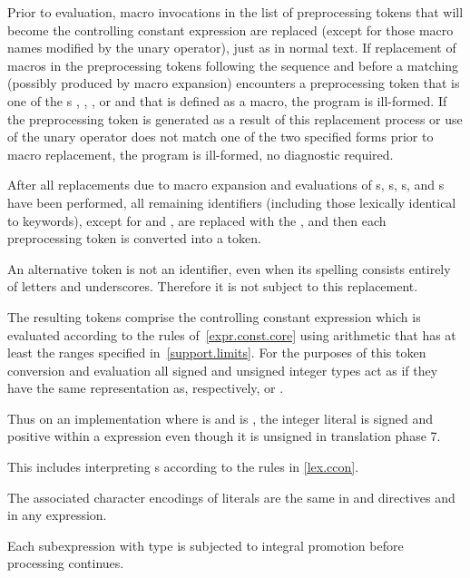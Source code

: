 \pnum
Prior to evaluation,
macro invocations in the list of preprocessing tokens
that will become the controlling constant expression
are replaced
(except for those macro names modified by the
unary operator),
just as in normal text.
If replacement of macros in the preprocessing tokens following the sequence
 and before a matching \tcode{)}
(possibly produced by macro expansion)
encounters a preprocessing token that is one of the s
, , , or 
and that  is defined
as a macro, the program is ill-formed.
If the preprocessing token
is generated as a result of this replacement process
or use of the
unary operator does not match one of the two specified forms
prior to macro replacement,
the program is ill-formed, no diagnostic required.

\pnum
After all replacements due to macro expansion and
evaluations of
s,
s,
s, and
s
have been performed,
all remaining identifiers (including those lexically identical to keywords),
except for
and
,
are replaced with the 
,
and then each preprocessing token is converted into a token.
\begin{note}
An alternative
token is not an identifier,
even when its spelling consists entirely of letters and underscores.
Therefore it is not subject to this replacement.
\end{note}

\pnum
The resulting tokens comprise the controlling constant expression
which is evaluated according to the rules of~\ref{expr.const.core}
using arithmetic that has at least the ranges specified
in~\ref{support.limits}. For the purposes of this token conversion and evaluation
all signed and unsigned integer types
act as if they have the same representation as, respectively,
 or .
\begin{note}
Thus on an
implementation where  is 
and  is ,
the integer literal  is signed and positive within a 
expression even though it is unsigned in translation phase
7.
\end{note}
This includes interpreting s
according to the rules in \ref{lex.ccon}.
\begin{note}
The associated character encodings of literals are the same
in  and  directives and in any expression.
\end{note}
Each subexpression with type
is subjected to integral promotion before processing continues.

